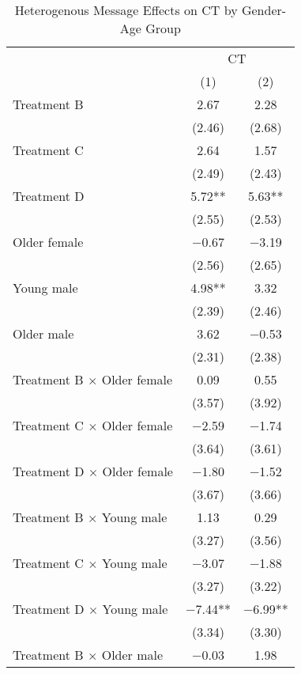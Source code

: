 \documentclass[12pt, a4paper]{article}
\begin{document}
\begin{table}[H]

\caption{\label{tab:lm-interaction-gender-age-test}Heterogenous Message Effects on CT by Gender-Age Group}
\centering
\fontsize{8}{10}\selectfont
\begin{threeparttable}
\begin{tabular}[t]{>{\raggedright\arraybackslash}p{20em}cc}
\toprule
\multicolumn{1}{c}{ } & \multicolumn{2}{c}{CT} \\
\cmidrule(l{3pt}r{3pt}){2-3}
  & (1) & (2)\\
\midrule
Treatment B & \num{2.67} & \num{2.28}\\
 & (\num{2.46}) & (\num{2.68})\\
Treatment C & \num{2.64} & \num{1.57}\\
 & (\num{2.49}) & (\num{2.43})\\
Treatment D & \num{5.72}** & \num{5.63}**\\
 & (\num{2.55}) & (\num{2.53})\\
Older female & \num{-0.67} & \num{-3.19}\\
 & (\num{2.56}) & (\num{2.65})\\
Young male & \num{4.98}** & \num{3.32}\\
 & (\num{2.39}) & (\num{2.46})\\
Older male & \num{3.62} & \num{-0.53}\\
 & (\num{2.31}) & (\num{2.38})\\
Treatment B $\times$ Older female & \num{0.09} & \num{0.55}\\
 & (\num{3.57}) & (\num{3.92})\\
Treatment C $\times$ Older female & \num{-2.59} & \num{-1.74}\\
 & (\num{3.64}) & (\num{3.61})\\
Treatment D $\times$ Older female & \num{-1.80} & \num{-1.52}\\
 & (\num{3.67}) & (\num{3.66})\\
Treatment B $\times$ Young male & \num{1.13} & \num{0.29}\\
 & (\num{3.27}) & (\num{3.56})\\
Treatment C $\times$ Young male & \num{-3.07} & \num{-1.88}\\
 & (\num{3.27}) & (\num{3.22})\\
Treatment D $\times$ Young male & \num{-7.44}** & \num{-6.99}**\\
 & (\num{3.34}) & (\num{3.30})\\
Treatment B $\times$ Older male & \num{-0.03} & \num{1.98}\\

\end{tabular}
\end{threeparttable}
\end{table}
\end{document}
